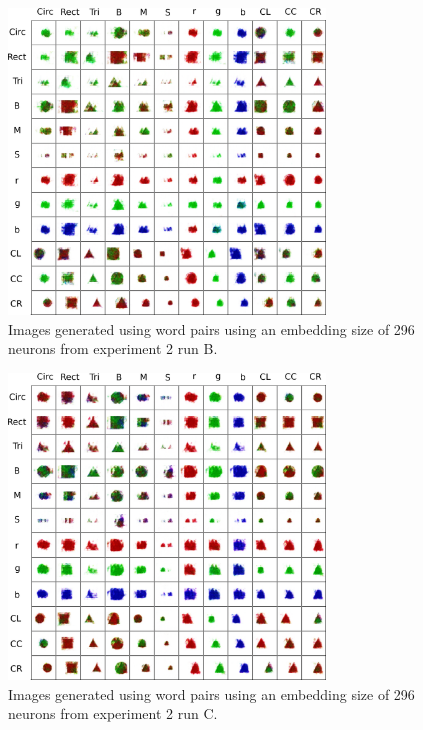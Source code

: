 \begin{figure}
\centering
\includegraphics[width=0.75\textwidth]{Figs/shapes/2word333B.png}
\caption{Images generated using word pairs using an embedding size of 296 neurons from experiment 2 run B.}
\label{fig:2word333B}
\end{figure}

\begin{figure}
\centering
\includegraphics[width=0.75\textwidth]{Figs/shapes/2word333C.png}
\caption{Images generated using word pairs using an embedding size of 296 neurons from experiment 2 run C.}
\label{fig:2word333C}
\end{figure}

